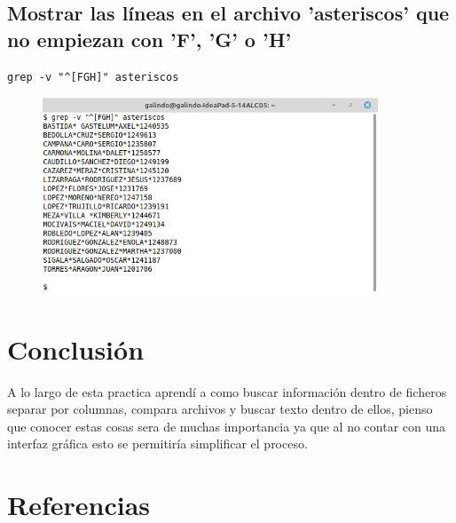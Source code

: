 \documentclass[11pt]{article}
\begin{document}
\cite{man7}

\pagebreak

\subsection{Mostrar las líneas en el archivo 'asteriscos' que no empiezan con 'F', 'G' o 'H'}
\label{sec:orgced1ffd}
\begin{verbatim}
grep -v "^[FGH]" asteriscos
\end{verbatim}

\begin{figure}[htbp]
\centering
\includegraphics[width=10cm]{img/a32.png}
\caption{}
\end{figure}


\section{Conclusión}
\label{sec:orgbda165a}
A lo largo de esta practica aprendí a como buscar información dentro de ficheros
separar por columnas, compara archivos y buscar texto dentro de ellos, pienso que 
conocer estas cosas sera de muchas importancia ya que al no contar con una 
interfaz gráfica esto se permitiría simplificar el proceso.

\section{Referencias}
\label{sec:orgf359461}
\printbibliography[heading=none]
\end{document}
